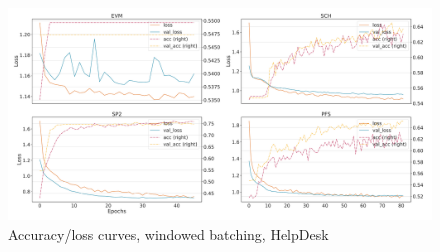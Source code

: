 \begin{figure}[!htb]
    \centering
    \includegraphics[width=\textwidth]{gfx/helpdesk/windowed_loss_acc_curve.pdf}
    \caption{Accuracy/loss curves, windowed batching, HelpDesk}
\end{figure}
\FloatBarrier


